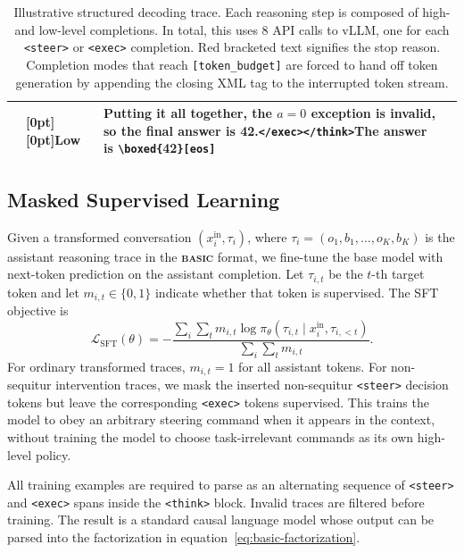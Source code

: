 \documentclass[10pt,twocolumn]{article}
\newcommand{\methodname}{\textbf{\textsf{\textsc{basic}}}}
\newcommand{\methodname}{{\sffamily\bfseries{\fontsize{0.95em}{0.95em}\selectfont BASIC}}}
\newcommand{\exectag}[1]{\textcolor{green!45!black}{\texttt{#1}}}
\newcommand{\budgettag}{\textcolor{red!80!black}{\texttt{[token\_budget]}}}
\newcommand{\eos}{\textcolor{red!80!black}{\texttt{[eos]}}}
\newcommand{\lowmodelabel}{\raisebox{0.9\baselineskip}[0pt][0pt]{Low}}
\begin{document}
\begin{table}[t]
{\begin{tabularx}{0.9\textwidth}{@{}c >{\raggedright\arraybackslash}p{} X >{\raggedright\arraybackslash}b{}@{}}
                         & \lowmodelabel & Putting it all together, the \(a=0\) exception is invalid, so the final answer is 42.\exectag{</exec>}\texttt{</think>}The answer is \texttt{\textbackslash boxed\{}42\texttt{\}}\eos           &                              \\
      \bottomrule
    \end{tabularx}
    \caption{
      Illustrative structured decoding trace. Each reasoning step is composed of high- and
      low-level completions. In total, this uses 8 API calls to vLLM, one for each \texttt{<steer>} or \texttt{<exec>} completion.
      Red bracketed text signifies the stop reason. Completion modes that reach \budgettag
      are
      forced to hand off
      token generation by appending the closing XML tag to the interrupted token stream.
    }
    \label{tab:structured-decoding-example}
  }%
\end{table}

\subsection{Masked Supervised Learning}
\label{sec:masked-supervised-learning}

Given a transformed conversation \((x_i^{\mathrm{in}},\tau_i)\), where
\(\tau_i=(o_1,b_1,\ldots,o_K,b_K)\) is the assistant reasoning trace in the
\methodname{} format, we fine-tune the base model with next-token
prediction on
the assistant completion. Let \(\tau_{i,t}\) be the \(t\)-th target
token and
let \(m_{i,t}\in\{0,1\}\) indicate whether that token is
supervised. The SFT
objective is
\begin{equation}
  \mathcal{L}_{\mathrm{SFT}}(\theta)
  =
  -\frac{
    \sum_i \sum_t m_{i,t}
    \log \pi_\theta(\tau_{i,t}\mid x_i^{\mathrm{in}},\tau_{i,<t})
  }{
    \sum_i \sum_t m_{i,t}
  }.
  \label{eq:sft-loss}
\end{equation}
For ordinary transformed traces, \(m_{i,t}=1\) for all
assistant tokens. For non-sequitur intervention traces, we mask the inserted
non-sequitur \texttt{<steer>} decision tokens but leave the corresponding
\texttt{<exec>} tokens supervised. This trains the model to obey an
arbitrary steering command when it appears in the context, without training the model
to choose task-irrelevant commands as its own high-level policy.

All training examples are required to parse as an alternating sequence of
\texttt{<steer>} and \texttt{<exec>} spans inside the
\texttt{<think>} block. Invalid traces are filtered
before training. The result is a standard causal language model whose output can be
parsed into the factorization in equation~\ref{eq:basic-factorization}.
\end{document}

